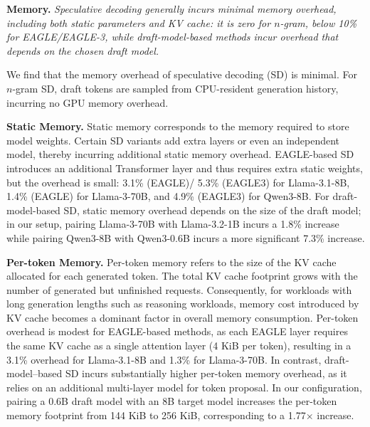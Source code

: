 \documentclass{article}
\newcommand{\lily}[1]{\textcolor{blue}{Lily: #1}}
\begin{document}
\begin{quoting}[leftmargin=1.5em, rightmargin=1.5em, vskip=0pt]
\textbf{Memory.}
\emph{Speculative decoding generally incurs minimal memory overhead, including both static parameters and KV cache: it is zero for $n$-gram, below 10\% for EAGLE/EAGLE-3, while draft-model-based methods incur overhead that depends on the chosen draft model.}
\end{quoting}
We find that the memory overhead of speculative decoding (SD) is minimal. For $n$-gram SD, draft tokens are sampled from CPU-resident generation history, incurring no GPU memory overhead. 

\textbf{Static Memory.} Static memory corresponds to the memory required to store model weights. Certain SD variants add extra layers or even an independent model, thereby incurring additional static memory overhead. EAGLE-based SD introduces an additional Transformer layer and thus requires extra static weights, but the overhead is small: 3.1\% (EAGLE)/ 5.3\% (EAGLE3) for Llama-3.1-8B, 1.4\% (EAGLE) for Llama-3-70B, and 4.9\% (EAGLE3) for Qwen3-8B.
For draft-model-based SD, static memory overhead depends on the size of the draft model; in our setup, pairing Llama-3-70B with Llama-3.2-1B incurs a 1.8\% increase while pairing Qwen3-8B with Qwen3-0.6B incurs a more significant 7.3\% increase. 

\textbf{Per-token Memory.} Per-token memory refers to the size of the KV cache allocated for each generated token. The total KV cache footprint grows with the number of generated but unfinished requests. Consequently, for workloads with long generation lengths such as reasoning workloads, memory cost introduced by KV cache becomes a dominant factor in overall memory consumption.
Per-token overhead is modest for EAGLE-based methods, as each EAGLE layer requires the same KV cache as a single attention layer (4 KiB per token), resulting in a 3.1\% overhead for Llama-3.1-8B and 1.3\% for Llama-3-70B. 
In contrast, draft-model–based SD incurs substantially higher per-token memory overhead, as it relies on an additional multi-layer model for token proposal. In our configuration, pairing a 0.6B draft model with an 8B target model increases the per-token memory footprint from 144 KiB to 256 KiB, corresponding to a 1.77$\times$ increase.



\end{document}
